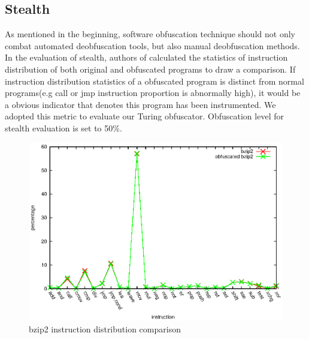 \documentclass[lnicst]{svmultln}
\begin{document}
\subsection{Stealth}
As mentioned in the beginning, software obfuscation technique should not only combat automated deobfuscation tools, but also manual deobfuscation methods. In the evaluation of stealth, authors of \cite{Trans} calculated the statistics of instruction distribution of both original and obfuscated programs to draw a comparison. If instruction distribution statistics of a obfuscated program is distinct from normal programs(e.g call or jmp instruction proportion is abnormally high), it would be a obvious indicator that denotes this program has been instrumented. We adopted this metric to evaluate our Turing obfuscator. Obfuscation level for stealth evaluation is set to 50\%.
\begin{figure}
  \includegraphics[width=0.9\linewidth]{st_bzip2.eps}
  \caption{bzip2 instruction distribution comparison}
  \label{Figure 4}
\end{figure}
\end{document}
